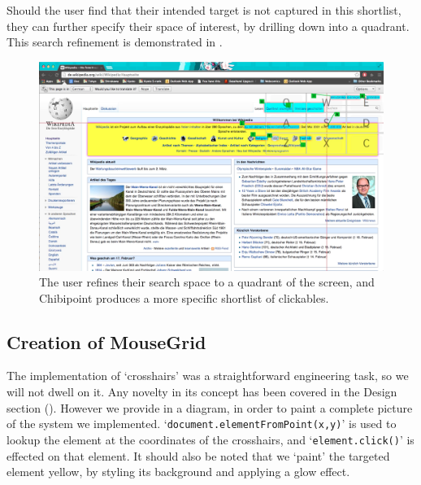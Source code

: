 \documentclass[11pt,openright,a4paper]{report}
\begin{document}
Should the user find that their intended target is not captured in this shortlist, they can further specify their space of interest, by drilling down into a quadrant. This search refinement is demonstrated in .

\begin{figure}[ht]
\centering\includegraphics[width=\textwidth]{figures/FlyoutsFilteredOriginal.png}
\caption{The user refines their search space to a quadrant of the screen, and Chibipoint produces a more specific shortlist of clickables.}
\label{fig:impFilteredClickable}
\end{figure}

\FloatBarrier

\subsection{Creation of MouseGrid}
The implementation of `crosshairs' was a straightforward engineering task, so we will not dwell on it. Any novelty in its concept has been covered in the Design section (). However we provide in  a diagram, in order to paint a complete picture of the system we implemented. `\texttt{document.elementFromPoint(x,y)}' is used to lookup the element at the coordinates of the crosshairs, and `\texttt{element.click()}' is effected on that element. It should also be noted that we `paint' the targeted element yellow, by styling its background and applying a glow effect.
\end{document}
